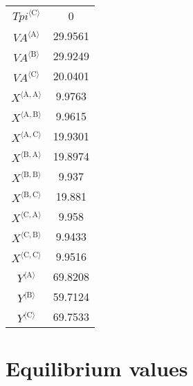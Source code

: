 \begin{tabular}{c|c|}
${{T\!p\!i}}^{\langle \mathrm{C}\rangle}$ & 0 \\
${{V\!A}}^{\langle \mathrm{A}\rangle}$ & 29.9561 \\
${{V\!A}}^{\langle \mathrm{B}\rangle}$ & 29.9249 \\
${{V\!A}}^{\langle \mathrm{C}\rangle}$ & 20.0401 \\
${X}^{\langle \mathrm{A},\mathrm{A}\rangle}$ & 9.9763 \\
${X}^{\langle \mathrm{A},\mathrm{B}\rangle}$ & 9.9615 \\
${X}^{\langle \mathrm{A},\mathrm{C}\rangle}$ & 19.9301 \\
${X}^{\langle \mathrm{B},\mathrm{A}\rangle}$ & 19.8974 \\
${X}^{\langle \mathrm{B},\mathrm{B}\rangle}$ & 9.937 \\
${X}^{\langle \mathrm{B},\mathrm{C}\rangle}$ & 19.881 \\
${X}^{\langle \mathrm{C},\mathrm{A}\rangle}$ & 9.958 \\
${X}^{\langle \mathrm{C},\mathrm{B}\rangle}$ & 9.9433 \\
${X}^{\langle \mathrm{C},\mathrm{C}\rangle}$ & 9.9516 \\
${Y}^{\langle \mathrm{A}\rangle}$ & 69.8208 \\
${Y}^{\langle \mathrm{B}\rangle}$ & 59.7124 \\
${Y}^{\langle \mathrm{C}\rangle}$ & 69.7533 \\
\hline
\end{tabular}


\section{Equilibrium values}


